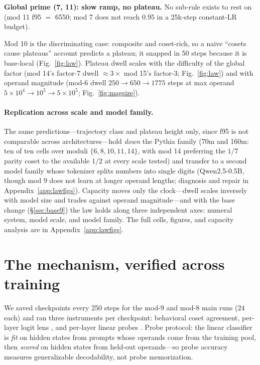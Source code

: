 \documentclass{article} %
\begin{document}
\textbf{Global prime (7, 11): slow ramp, no plateau.} No sub-rule exists to rest on (mod 11 f95 $=$ 6550; mod 7 does not reach 0.95 in a 25k-step constant-LR budget).

Mod 10 is the discriminating case: composite and coset-rich, so a naive ``cosets cause plateaus'' account predicts a plateau; it snapped in 50 steps because it is base-local (Fig.~\ref{fig:law}). Plateau dwell scales with the difficulty of the global factor (mod 14's factor-7 dwell $\approx 3\times$ mod 15's factor-3; Fig.~\ref{fig:law}) and with operand magnitude (mod-6 dwell $250 \to 650 \to 1775$ steps at max operand $5\times10^4 \to 10^5 \to 5\times10^5$; Fig.~\ref{fig:magsize}).

\paragraph{Replication across scale and model family.} The same predictions---trajectory class and plateau height only, since f95 is not comparable across architectures---hold \emph{down} the Pythia family (70m and 160m: ten of ten cells over moduli $\{6, 8, 10, 11, 14\}$, with mod 14 preferring the $1/7$ parity coset to the available $1/2$ at every scale tested) and transfer to a second model family whose tokenizer splits numbers into single digits (Qwen2.5-0.5B, though mod 9 does not learn at longer operand lengths; diagnosis and repair in Appendix~\ref{app:lawfigs}). Capacity moves only the clock---dwell scales inversely with model size and trades against operand magnitude---and with the base change (\S\ref{sec:base9}) the law holds along three independent axes: numeral system, model scale, and model family. The full cells, figures, and capacity analysis are in Appendix~\ref{app:lawfigs}.


\section{The mechanism, verified across training}
\label{sec:mechanism}

We saved checkpoints every 250 steps for the mod-9 and mod-8 main runs (24 each) and ran three instruments per checkpoint: behavioral coset agreement, per-layer logit lens \citep{nostalgebraist2020logitlens}, and per-layer linear probes \citep{alain2016probes}. Probe protocol: the linear classifier is \emph{fit} on hidden states from prompts whose operands come from the training pool, then \emph{scored} on hidden states from held-out operands---so probe accuracy measures generalizable decodability, not probe memorization.
\end{document}
